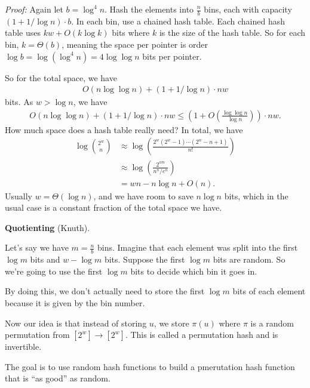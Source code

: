 \documentclass{report}
\begin{document}
\noindent \textit{Proof:} Again let $b = \log^4 n$. Hash the elements into $\frac nb$ bins, each  with capacity $(1 + 1/\log n)\cdot b$. In each bin, use a chained hash table. Each chained hash table uses $kw + O(k \log k)$ bits where $k$ is the size of the hash table. So for each bin, $k = \Theta(b)$, meaning the space per pointer is order $\log b = \log(\log^4 n) = 4\log \log n$ bits per pointer.

So for the total space, we have 
\begin{align*}
    O(n \log \log n) + (1 + 1/\log n) \cdot nw
\end{align*}
bits. As $w > \log n$, we have 
\begin{align*}
    O(n \log \log n) + (1 + 1/\log n) \cdot nw \leq \left(1 + O\left(\frac{\log \log n}{\log n}\right)\right) \cdot nw.
\end{align*}
\noindent How much space does a hash table really need? In total, we have 
\begin{align*}
    \log \binom{2^w}{n} &\approx \log\left( \frac{2^w (2^w - 1)\cdots(2^w - n + 1)}{n!} \right) \\
    &\approx \log\left(\frac{2^{wn}}{n^n/e^n}\right) \\
    &= wn - n \log n + O(n).
\end{align*}
Usually $w = \Theta(\log n)$, and we have room to save $n \log n$ bits, which in the usual case is a constant fraction of the total space we have.

\noindent \textbf{Quotienting} (Knuth).

Let's say we have $m = \frac nb$ bins. Imagine that each element was split into the first $\log m$ bits and $w - \log m$ bits. Suppose the first $\log m$ bits are random. So we're going to use the first $\log m$ bits to decide which bin it goes in. 

By doing this, we don't actually need to store the first $\log m$ bits of each element because it is given by the bin number.

Now our idea is that instead of storing $u$, we store $\pi(u)$ where $\pi$ is a random permutation from $[2^w] \to [2^w]$. This is called a permutation hash and is invertible. 

The goal is to use random hash functions to build a pmerutation hash function that is ``as good'' as random.
\end{document}
